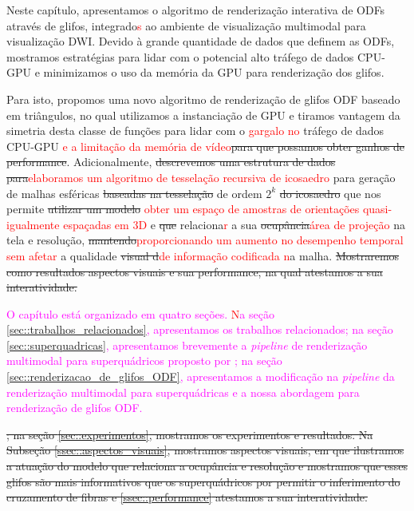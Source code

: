Neste capítulo, apresentamos o algoritmo de renderização interativa de ODFs através de glifos, integrado\textcolor{red}{s} ao ambiente de visualização multimodal para visualização DWI. Devido à grande quantidade de dados que definem as ODFs, mostramos estratégias para lidar com o potencial alto tráfego de dados CPU-GPU e minimizamos o uso da memória da GPU para renderização dos glifos.

Para isto, propomos uma novo algoritmo de renderização de glifos ODF baseado em triângulos, no qual utilizamos a instanciação de GPU e tiramos vantagem da simetria desta classe de funções para lidar com o \textcolor{red}{gargalo no }tráfego de dados CPU-GPU \textcolor{red}{e a limitação da memória de vídeo}\sout{para que possamos obter ganhos de performance}. Adicionalmente, \sout{descrevemos uma estrutura de dados para}\textcolor{red}{elaboramos um algoritmo de tesselação recursiva de icosaedro} para geração de malhas esféricas \sout{baseadas na tesselação} de ordem $2^k$ \sout{do icosaedro} que nos permite \sout{utilizar um modelo} \textcolor{red}{obter um espaço de amostras de orientações quasi-igualmente espaçadas em 3D} e \sout{que} relaciona\textcolor{red}{r} a sua \sout{ocupância}\textcolor{red}{área de projeção} na tela e resolução, \sout{mantendo}\textcolor{red}{proporcionando um aumento no desempenho temporal sem afetar} a qualidade \sout{visual d}\textcolor{red}{de informação codificada n}a malha.\sout{ Mostraremos como resultados aspectos visuais e sua performance, na qual atestamos a sua interatividade.}

\textcolor{magenta}{
O capítulo está organizado em quatro seções. \textcolor{red}{N}a seção \ref{sec::trabalhos_relacionados}, apresentamos os trabalhos relacionados; na seção \ref{sec::superquadricas}, apresentamos brevemente a \textit{pipeline} de renderização multimodal para superquádricos proposto por ; na seção \ref{sec::renderizacao_de_glifos_ODF}, apresentamos a modificação na \textit{pipeline} da renderização multimodal para superquádricas e a nossa abordagem para renderização de glifos ODF.
}

\sout{; na seção \ref{sec::experimentos}, mostramos os experimentos e resultados. Na Subseção \ref{ssec::aspectos_visuais}, mostramos aspectos visuais, em que ilustramos a atuação do modelo que relaciona a ocupância e resolução e mostramos que esses glifos são mais informativos que os superquádricos por permitir o inferimento do cruzamento de fibras e \ref{ssec::performance} atestamos a sua interatividade.}

